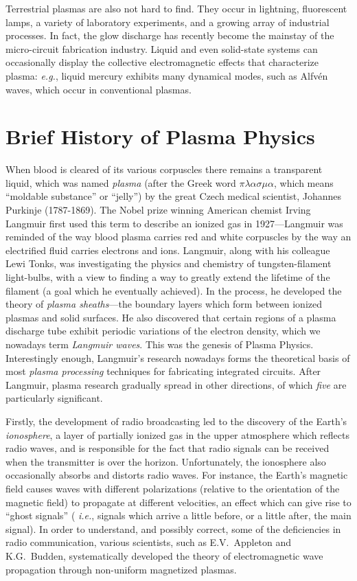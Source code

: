Terrestrial plasmas are also  not hard to find. They occur in lightning,
fluorescent lamps, a variety of laboratory experiments, and a growing
array of industrial processes. In fact, the glow discharge has recently
become the mainstay of the micro-circuit fabrication industry. 
Liquid and even solid-state systems can occasionally display the
collective electromagnetic effects that characterize plasma:
{\em e.g.}, liquid mercury exhibits many dynamical modes, such
as Alfv\'{e}n waves,  which occur in conventional  plasmas. 

\section{Brief History of Plasma Physics}
When blood is cleared of its various corpuscles there remains a transparent liquid,
which was named {\em plasma}\/ (after the Greek word $\pi\lambda\alpha\sigma\mu\alpha$,
which means ``moldable substance'' or ``jelly'') by the great Czech medical
scientist, Johannes Purkinje (1787-1869). The Nobel prize winning
American chemist Irving Langmuir first used this term to describe an
ionized gas in 1927---Langmuir was reminded of the way blood plasma carries
red and white corpuscles by the way an electrified fluid carries
electrons and ions. Langmuir, along with his colleague Lewi Tonks, was 
investigating the physics and chemistry of tungsten-filament light-bulbs, with a view to finding a way to greatly
extend the lifetime of the filament (a goal which he
eventually achieved). In the process, he developed the theory of
 {\em plasma sheaths}---the
boundary layers which form between  ionized plasmas and  solid surfaces. 
He also  discovered that certain regions of
a plasma discharge tube exhibit periodic variations of the electron
density, which we nowadays term {\em Langmuir waves}. This was the
genesis of Plasma Physics. Interestingly enough,  
Langmuir's research 
 nowadays forms the theoretical basis of most {\em plasma processing}\/ techniques for
fabricating integrated circuits. 
After Langmuir, plasma research gradually spread in other
directions, of which {\em five}\/ are particularly significant.

Firstly, the development of radio broadcasting led to the discovery of
the Earth's {\em ionosphere}, a layer of partially ionized gas in the
upper atmosphere which reflects radio waves, and is responsible for the fact that
radio signals
 can be received when the transmitter is over the horizon. Unfortunately,
the ionosphere also occasionally absorbs and distorts radio waves. 
For instance, the Earth's
magnetic field causes waves  with different
polarizations (relative to the orientation of the magnetic field) to propagate at
different velocities, an effect which can give rise to ``ghost signals'' ({\em
i.e.}, signals which arrive a little before, or a little after, the main signal). 
In order to understand, and possibly correct, some of the deficiencies
in  radio communication,
various scientists, such as E.V.~Appleton and K.G.~Budden, systematically
developed the theory of 
electromagnetic wave propagation  through  non-uniform magnetized plasmas.

